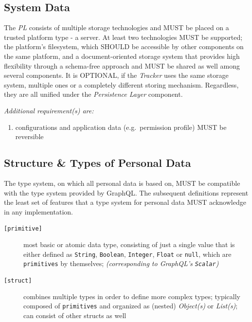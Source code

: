 \documentclass[12pt,english,a4paper,titlepage,cleardoublepage=empty,dottedtoc]{report}
\providecommand{\tightlist}{%
  \setlength{\itemsep}{0pt}\setlength{\parskip}{0pt}}
\begin{document}
\subsection{System Data}\label{system-data}

The \emph{PL} consists of multiple storage technologies and MUST be
placed on a trusted platform type - a server. At least two technologies
MUST be supported; the platform's filesystem, which SHOULD be accessible
by other components on the same platform, and a document-oriented
storage system that provides high flexibility through a schema-free
approach and MUST be shared as well among several components. It is
OPTIONAL, if the \emph{Tracker} uses the same storage system, multiple
ones or a completely different storing mechanism. Regardless, they are
all unified under the \emph{Persistence Layer} component.

\emph{Additional requirement(s) are:}

\begin{enumerate}
\def\labelenumi{\alph{enumi})}
\tightlist
\item
  configurations and application data (e.g.~permission profile) MUST be
  reversible
\end{enumerate}

\subsection{Structure \& Types of Personal
Data}\label{structure-types-of-personal-data}

The type system, on which all personal data is based on, MUST be
compatible with the type system provided by GraphQL. The subsequent
definitions represent the least set of features that a type system for
personal data MUST acknowledge in any implementation.

\begin{description}
\item[\texttt{{[}primitive{]}}]
most basic or atomic data type, consisting of just a single value that
is either defined as \texttt{String}, \texttt{Boolean},
\texttt{Integer}, \texttt{Float} or \texttt{null}, which are
\texttt{primitives} by themselves; \emph{(corresponding to GraphQL's
\texttt{Scalar})}
\item[\texttt{{[}struct{]}}]
combines multiple types in order to define more complex types; typically
composed of \texttt{primitives} and organized as (nested)
\emph{Object(s)} or \emph{List(s)}; can consist of other structs as well
\end{description}
\end{document}
